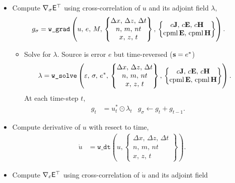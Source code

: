 \documentclass[a4paper,12pt]{article}
\begin{document}
\begin{itemize}
\item Compute $\nabla_{\sigma}{\sf E}^\top$ using cross-correlation of $u$ and its adjoint field $\lambda$,
\begin{align*}
g_{\sigma}
&= 
\texttt{w\_grad}\left(
u,\, e,\,
M,\,
\left\{
\begin{matrix}
\Delta x,\, \Delta z, \, \Delta t \\
n,\, m, \, nt \\
x, \, z, \, t
\end{matrix}
\right\}, \,
\left\{
\begin{matrix}
c{\bf J},\,c{\bf E},\,c{\bf H} \\
\text{cpml}\,{\bf E},\, \text{cpml}\,{\bf H}
\end{matrix}
\right\}
\right).
\end{align*}
%
\begin{itemize}
\item Solve for $\lambda$. Source is error $e$ but time-reversed (${\bf s}=e^*$)
\begin{align*}
\lambda
&= 
\texttt{w\_solve}\left(
\varepsilon,\,\sigma,\, e^*, \,
\left\{
\begin{matrix}
\Delta x,\, \Delta z, \, \Delta t \\
n,\, m, \, nt \\
x, \, z, \, t
\end{matrix}
\right\} ,\,
\left\{
\begin{matrix}
c{\bf J},\,c{\bf E},\,c{\bf H} \\
\text{cpml}\,{\bf E},\, \text{cpml}\,{\bf H}
\end{matrix}
\right\}
\right).
\end{align*}
At each time-step $t$, 
\begin{align*}
g_{t} &= u^{*}_{t} \odot \lambda_{t} &
g_{\sigma} \gets g_{t} + g_{t-1}.
\end{align*}
\end{itemize}
%
\item Compute derivative of $u$ with resect to time,
\begin{align*}
\dot{u} &= \texttt{w\_dt}\left(u,
\left\{
\begin{matrix}
\Delta x,\, \Delta z, \, \Delta t \\
n,\, m, \, nt \\
x, \, z, \, t
\end{matrix}
\right\}
\right).
\end{align*}
\item Compute $\nabla_{\varepsilon}{\sf E}^\top$ using cross-correlation of $\dot{u}$ and its adjoint field 

\end{itemize}
\end{document}

